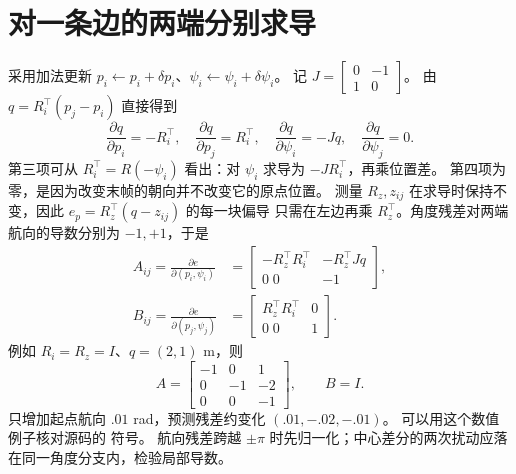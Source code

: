 \section{对一条边的两端分别求导}
采用加法更新 $p_i\leftarrow p_i+\delta p_i$、$\psi_i\leftarrow\psi_i+\delta\psi_i$。
记 $J=\left[\begin{smallmatrix}0&-1\\1&0\end{smallmatrix}\right]$。
由 $q=R_i^\top(p_j-p_i)$ 直接得到
\begin{equation}
\frac{\partial q}{\partial p_i}=-R_i^\top,\quad
\frac{\partial q}{\partial p_j}=R_i^\top,\quad
\frac{\partial q}{\partial\psi_i}=-Jq,\quad
\frac{\partial q}{\partial\psi_j}=0.
\end{equation}
第三项可从 $R_i^\top=R(-\psi_i)$ 看出：对 $\psi_i$ 求导为 $-JR_i^\top$，再乘位置差。
第四项为零，是因为改变末帧的朝向并不改变它的原点位置。
测量 $R_z,z_{ij}$ 在求导时保持不变，因此 $e_p=R_z^\top(q-z_{ij})$ 的每一块偏导
只需在左边再乘 $R_z^\top$。角度残差对两端航向的导数分别为 $-1,+1$，于是
\begin{align}
A_{ij}=\frac{\partial e}{\partial(p_i,\psi_i)}
&=\begin{bmatrix}-R_z^\top R_i^\top&-R_z^\top Jq\\0\;0&-1\end{bmatrix},\\
B_{ij}=\frac{\partial e}{\partial(p_j,\psi_j)}
&=\begin{bmatrix}R_z^\top R_i^\top&0\\0\;0&1\end{bmatrix}.
\end{align}
例如 $R_i=R_z=I$、$q=(2,1)$ m，则
\begin{equation}
A=\begin{bmatrix}-1&0&1\\0&-1&-2\\0&0&-1\end{bmatrix},\qquad B=I.
\end{equation}
只增加起点航向 $.01$ rad，预测残差约变化 $(.01,-.02,-.01)$。
可以用这个数值例子核对源码的  符号。
航向残差跨越 $\pm\pi$ 时先归一化；中心差分的两次扰动应落在同一角度分支内，检验局部导数。

\par\noindent\begin{minipage}{\linewidth}

\end{minipage}\par

